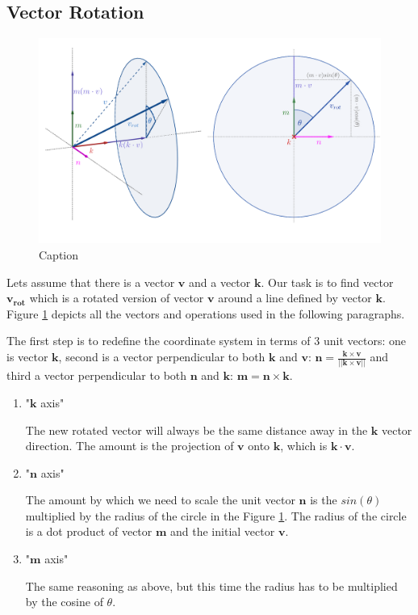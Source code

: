 \subsection{Vector Rotation}

\begin{figure}
    \centering
    \includegraphics[scale=3]{imgs_tomas/rodrigues_3d2d.png}
    \caption{Caption}
    \label{fig:rodrigues3d2d}
\end{figure}

Lets assume that there is a vector $\bm{v}$ and a vector $\bm{k}$. Our task is to find vector $\bm{v_{rot}}$ which is a rotated version of vector $\bm{v}$ around a line defined by vector $\bm{k}$. Figure \ref{fig:rodrigues3d2d} depicts all the vectors and operations used in the following paragraphs.

The first step is to redefine the coordinate system in terms of 3 unit vectors: one is vector $\bm{k}$, second is a vector perpendicular to both $\bm{k}$ and $\bm{v}$: $\bm{n} = \frac{\bm{k} \times \bm{v}}{||\bm{k} \times \bm{v}||}$ and third a vector perpendicular to both $\bm{n}$ and $\bm{k}$: $\bm{m} = \bm{n} \times \bm{k}$.

\begin{enumerate}
    \item "$\bm{k}$ axis"
    
    The new rotated vector will always be the same distance away in the $\bm{k}$ vector direction. The amount is the projection of $\bm{v}$ onto $\bm{k}$, which is $\bm{k} \cdot \bm{v}$.
    
    \item "$\bm{n}$ axis"
    
    The amount by which we need to scale the unit vector $\bm{n}$ is the $sin(\theta)$ multiplied by the radius of the circle in the Figure \ref{fig:rodrigues3d2d}. The radius of the circle is a dot product of vector $\bm{m}$ and the initial vector $\bm{v}$.
    \item "$\bm{m}$ axis"
    
    The same reasoning as above, but this time the radius has to be multiplied by the cosine of $\theta$.
\end{enumerate}

